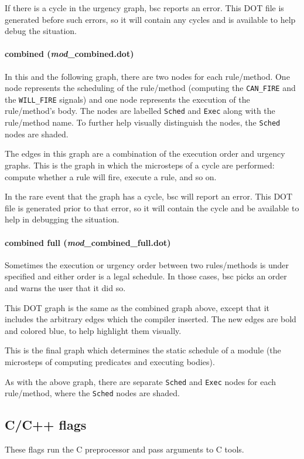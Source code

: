 \documentclass{article}
\newcommand{\te}[1]{\texttt{#1}}
\begin{document}
If there is a cycle in the urgency graph, bsc reports an error.
This DOT file is generated before such errors, so it will contain any
cycles and is available to help debug the situation.

\paragraph{combined (\emph{mod}\_combined.dot)}
In this and the following graph, there are two nodes for each rule/method.
One node represents the scheduling of the rule/method (computing the
\te{CAN\_FIRE} and the \te{WILL\_FIRE} signals)
and one node represents the execution of the rule/method's body.  The
nodes are labelled \te{Sched} and \te{Exec} along with the
rule/method name. To further help visually distinguish the nodes, the
\te{Sched} nodes are shaded.

The edges in this graph are a combination of the execution order
and urgency graphs.  This is the graph in which the
microsteps of a cycle are performed: compute whether a rule will fire,
execute a rule, and so on.

In the rare event that the graph has a cycle, bsc will report an error.
This DOT file is generated prior to that error, so it will contain the
cycle and be available to help in debugging the situation.

\paragraph{combined full (\emph{mod}\_combined\_full.dot)}

Sometimes the execution or urgency order between two rules/methods is
under specified and either order is a legal schedule.  In those cases, bsc
picks an order and warns the user that it did so.

This DOT graph is the same as the combined graph above, except that it includes the
arbitrary edges which the compiler inserted.  The new edges are bold
and colored blue, to help highlight them visually.

This is the final graph which determines the static schedule of a module
(the microsteps of computing predicates and executing bodies).

As with the above graph, there are separate \te{Sched} and \te{Exec} nodes
for each rule/method, where the \te{Sched} nodes are shaded.



\subsection{C/C++ flags }
\label{flags-c}
These flags run the C preprocessor and pass arguments to C tools.
\end{document}
